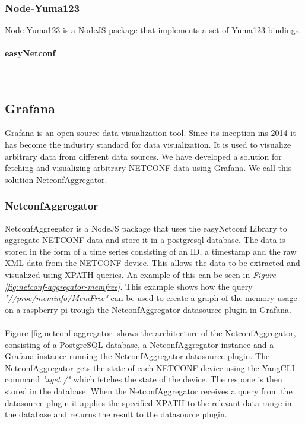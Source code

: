 \documentclass[12pt]{article}
\newcommand{\subsubsubsection}[1]{\paragraph{#1}\mbox{}\\}
\begin{document}
\subsubsection{Node-Yuma123}
Node-Yuma123 \cite{Nodeyuma1232025} is a NodeJS package that implements a set of Yuma123 bindings.


\subsubsubsection{easyNetconf}

\subsection{Grafana}
Grafana is an open source data visualization tool. Since its inception ins 2014 it has become the industry standard
for data visualization. It is used to visualize arbitrary data from different data sources.
We have developed a solution for fetching and visualizing arbitrary NETCONF data using Grafana.
We call this solution NetconfAggregator.

\subsubsection{NetconfAggregator}
NetconfAggregator is a NodeJS package that uses the easyNetconf Library \cite{heimonenSlenderman00Netconfaggregator2025} to aggregate NETCONF data and store 
it in a postgresql database. The data is stored in the form of a time series consisting of an ID, a timestamp and the 
raw XML data from the NETCONF device. This allows the data to be extracted and visualized using XPATH queries.
An example of this can be seen in \textit{Figure \ref{fig:netconf-aggregator-memfree}}.
This example shows how the query \textit{"//proc/meminfo/MemFree"} can be used to create a graph of the memory usage 
on a raspberry pi trough the NetconfAggregator datasource plugin in Grafana.
\\
\\
Figure \ref{fig:netconf-aggregator} shows the architecture of the NetconfAggregator, consisting
of a PostgreSQL database, a NetconfAggregator instance and a Grafana instance running the NetconfAggregator datasource plugin.
The NetconfAggregator gets the state of each NETCONF device using the YangCLI command \textit{"xget /"} which
fetches the state of the device. The respone is then stored in the database.
When the NetconfAggregator receives a query from the datasource plugin it applies the specified XPATH to 
the relevant data-range in the database and returns the result to the datasource plugin.
\end{document}
